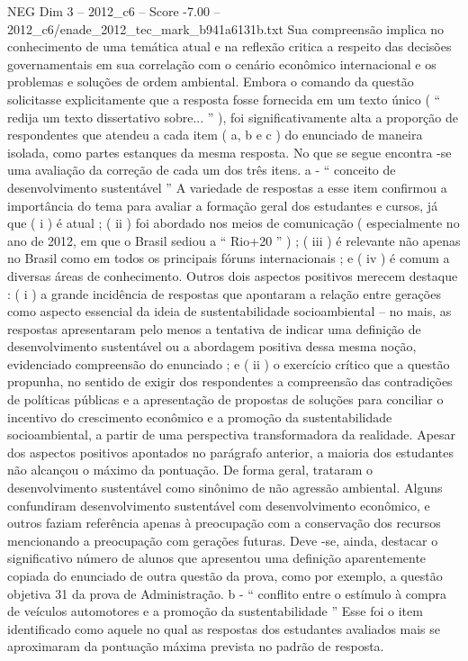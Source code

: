 \begin{textsample}{NEG Dim 3 – 2012\_c6 – Score -7.00 – 2012\_c6/enade\_2012\_tec\_mark\_b941a6131b.txt}
Sua compreensão implica no conhecimento de uma temática atual e na reflexão critica a respeito das decisões governamentais em sua correlação com o cenário econômico internacional e os problemas e soluções de ordem ambiental.
Embora o comando da questão solicitasse explicitamente que a resposta fosse fornecida em um texto único ( “ redija um texto dissertativo sobre... ” ), foi significativamente alta a proporção de respondentes que atendeu a cada item ( a, b e c ) do enunciado de maneira isolada, como partes estanques da mesma resposta.
No que se segue encontra -se uma avaliação da correção de cada um dos três itens. a - “ conceito de desenvolvimento sustentável ” A variedade de respostas a esse item confirmou a importância do tema para avaliar a formação geral dos estudantes e cursos, já que ( i ) é atual ; ( ii ) foi abordado nos meios de comunicação ( especialmente no ano de 2012, em que o Brasil sediou a “ Rio+20 ” ) ; ( iii ) é relevante não apenas no Brasil como em todos os principais fóruns internacionais ; e ( iv ) é comum a diversas áreas de conhecimento.
Outros dois aspectos positivos merecem destaque : ( i ) a grande incidência de respostas que apontaram a relação entre gerações como aspecto essencial da ideia de sustentabilidade socioambiental – no mais, as respostas apresentaram pelo menos a tentativa de indicar uma definição de desenvolvimento sustentável ou a abordagem positiva dessa mesma noção, evidenciado compreensão do enunciado ; e ( ii ) o exercício crítico que a questão propunha, no sentido de exigir dos respondentes a compreensão das contradições de políticas públicas e a apresentação de propostas de soluções para conciliar o incentivo do crescimento econômico e a promoção da sustentabilidade socioambiental, a partir de uma perspectiva transformadora da realidade.
Apesar dos aspectos positivos apontados no parágrafo anterior, a maioria dos estudantes não alcançou o máximo da pontuação.
De forma geral, trataram o desenvolvimento sustentável como sinônimo de não agressão ambiental.
Alguns confundiram desenvolvimento sustentável com desenvolvimento econômico, e outros faziam referência apenas à preocupação com a conservação dos recursos mencionando a preocupação com gerações futuras.
Deve -se, ainda, destacar o significativo número de alunos que apresentou uma definição aparentemente copiada do enunciado de outra questão da prova, como por exemplo, a questão objetiva 31 da prova de Administração. b - “ conflito entre o estímulo à compra de veículos automotores e a promoção da sustentabilidade ” Esse foi o item identificado como aquele no qual as respostas dos estudantes avaliados mais se aproximaram da pontuação máxima prevista no padrão de resposta.

\end{textsample}
